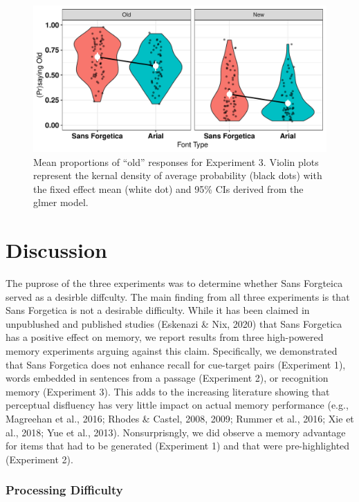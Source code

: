 \documentclass[english,doc]{apa6}
\begin{document}
\begin{figure}

{\centering \includegraphics{SF_Paper_files/figure-latex/unnamed-chunk-5-1} 

}

\caption{Mean proportions of “old” responses for Experiment 3. Violin plots represent the kernal density of average probability (black dots) with the fixed effect mean (white dot) and 95\% CIs derived from the glmer model.}\label{fig:unnamed-chunk-5}
\end{figure}

\hypertarget{discussion}{%
\section{Discussion}\label{discussion}}

The puprose of the three experiments was to determine whether Sans Forgteica served as a desirble diffculty. The main finding from all three experiments is that Sans Forgetica is not a desirable difficulty. While it has been claimed in unpublushed and published studies (Eskenazi \& Nix, 2020) that Sans Forgetica has a positive effect on memory, we report results from three high-powered memory experiments arguing against this claim. Specifically, we demonstrated that Sans Forgetica does not enhance recall for cue-target pairs (Experiment 1), words embedded in sentences from a passage (Experiment 2), or recognition memory (Experiment 3). This adds to the increasing literature showing that perceptual disfluency has very little impact on actual memory performance (e.g., Magreehan et al., 2016; Rhodes \& Castel, 2008, 2009; Rummer et al., 2016; Xie et al., 2018; Yue et al., 2013). Nonsurprisngly, we did observe a memory advantage for items that had to be generated (Experiment 1) and that were pre-highlighted (Experiment 2).

\hypertarget{processing-difficulty}{%
\subsubsection{Processing Difficulty}\label{processing-difficulty}}
\end{document}
